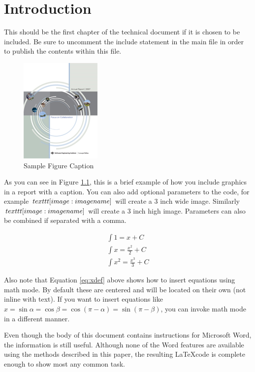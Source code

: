 \chapter{Introduction}\label{ch:intro}
This should be the first chapter of the technical document if it is chosen to be included. Be sure to uncomment the include statement in the main file in order to publish the contents within this file.

\begin{figure}[htbp]
	\centering
	\includegraphics{assets/abs_image}
	\caption{Sample Figure Caption}
	\label{samplefigure}
\end{figure}

As you can see in Figure \ref{samplefigure}, this is a brief example of how you include graphics in a report with a caption. You can also add optional parameters to the code, for example $\\texttt{[image: imagename]}$ will create a 3 inch wide image. Similarly $\\texttt{[image: imagename]}$ will create a 3 inch high image. Parameters can also be combined if separated with a comma.

\begin{equation}
	\begin{array}{l}
		\displaystyle \int 1 = x + C\\
		\displaystyle \int x = \frac{x^2}{2} + C \\
		\displaystyle \int x^2 = \frac{x^3}{3} + C
	\end{array} 
	\label{eq:xdef}
\end{equation}

Also note that Equation \ref{eq:xdef} above shows how to insert equations using math mode. By default these are centered and will be located on their own (not inline with text). If you want to insert equations like $x = \sin \alpha = \cos \beta = \cos(\pi-\alpha) = \sin(\pi-\beta)$, you can invoke math mode in a different manner.

Even though the body of this document contains instructions for Microsoft Word, the information is still useful. Although none of the Word features are available using the methods described in this paper, the resulting \LaTeX\space code is complete enough to show most any common task.

